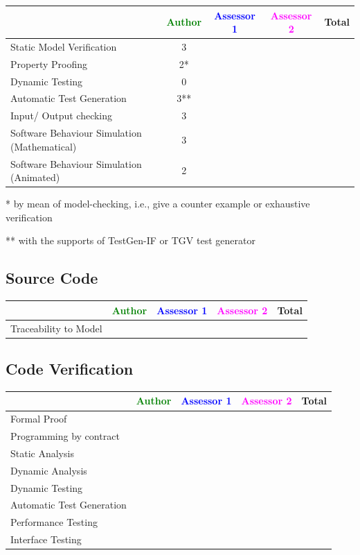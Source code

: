 \begin{tabular}{|l | c | c | c | c|}
\hline
& \textcolor{green}{Author} & \textcolor{blue}{Assessor 1} & \textcolor{magenta}{Assessor 2} & Total \\
\hline 
Static Model Verification & 3 & & &  \\
\hline
Property Proofing & 2* & & &  \\
\hline
Dynamic Testing & 0 & & &  \\
\hline
Automatic Test Generation & 3** & & &  \\
\hline
Input/ Output checking & 3 & & &  \\
\hline
Software Behaviour Simulation (Mathematical) & 3 & & &  \\
\hline
Software Behaviour Simulation (Animated) & 2 & & &  \\
\hline
\end{tabular}


\begin{author_comment}

	* by mean of model-checking, i.e., give a counter example or exhaustive verification

	** with the supports of TestGen-IF or TGV test generator
	
\end{author_comment}

\subsection{Source Code}


\begin{tabular}{|l | c | c | c | c|}
\hline
& \textcolor{green}{Author} & \textcolor{blue}{Assessor 1} & \textcolor{magenta}{Assessor 2} & Total \\
\hline 
Traceability to Model & & & &  \\
\hline
\end{tabular}


\subsection{Code Verification	}


\begin{tabular}{|l | c | c | c | c|}
\hline
& \textcolor{green}{Author} & \textcolor{blue}{Assessor 1} & \textcolor{magenta}{Assessor 2} & Total \\
\hline 
Formal Proof & & & &  \\
\hline
Programming by contract & & & &  \\
\hline
Static Analysis & & & &  \\
\hline
Dynamic Analysis & & & &  \\
\hline
Dynamic Testing & & & &  \\
\hline
Automatic Test Generation & & & &  \\
\hline
Performance Testing & & & &  \\
\hline
Interface Testing & & & &  \\
\hline
\end{tabular}

